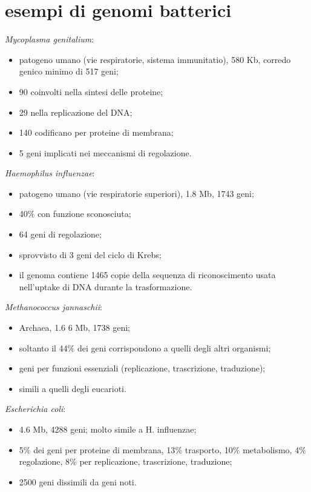 \section{esempi di genomi batterici}
\begin{multicols}{2}
\textit{Mycoplasma genitalium}:
\begin{itemize}
    \item patogeno umano (vie respiratorie, sistema immunitatio), 580 Kb, corredo genico minimo di 517 geni;
    \item 90 coinvolti nella sintesi delle proteine;
    \item 29 nella replicazione del DNA; 
    \item 140 codificano per proteine di membrana; 
    \item 5 geni implicati nei meccanismi di regolazione.
\end{itemize}
\textit{Haemophilus influenzae}:
\begin{itemize}
    \item patogeno umano (vie respiratorie superiori), 1.8
 Mb, 1743 geni;
    \item 40$\%$ con funzione sconosciuta;
    \item 64 geni di regolazione; 
    \item sprovvisto di 3 geni del ciclo di Krebs; 
    \item il genoma contiene 1465 copie della sequenza di riconoscimento usata nell'uptake di DNA durante la trasformazione.
\end{itemize}
\textit{Methanococcus jannaschii}: 
\begin{itemize}
    \item Archaea, 1.6
6 Mb, 1738 geni; 
    \item soltanto il 44$\%$ dei geni corrispondono a quelli degli altri organismi; 
    \item geni per funzioni  essenziali (replicazione, trascrizione, traduzione);
    \item simili a quelli degli eucarioti.
\end{itemize}
\textit{Escherichia coli}: 
\begin{itemize}
    \item 4.6
 Mb, 4288 geni; molto simile a H. 
influenzae;
    \item 5$\%$ dei geni per proteine di membrana, 13$\%$ trasporto, 10$\%$ metabolismo, 4$\%$ regolazione, 8$\%$ per replicazione, trascrizione, traduzione;
    \item 2500 geni dissimili da geni noti.

\end{itemize}
\end{multicols}
